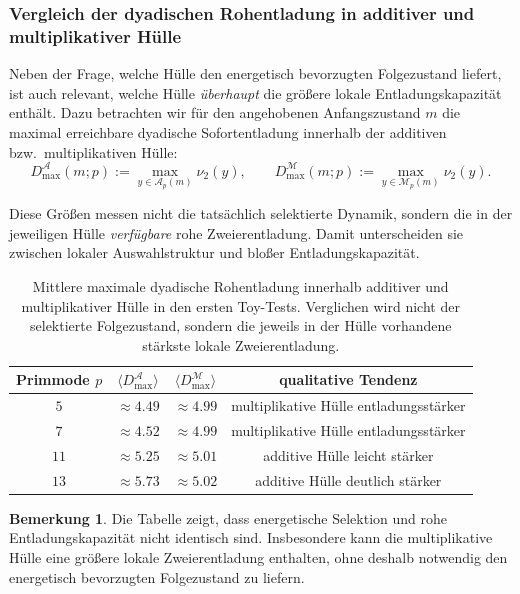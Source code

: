 \documentclass[11pt,a4paper]{article}
\theoremstyle{definition}
\newtheorem{bemerkung}{Bemerkung}
\begin{document}
\subsubsection{Vergleich der dyadischen Rohentladung in additiver und multiplikativer Hülle}

Neben der Frage, welche Hülle den energetisch bevorzugten Folgezustand liefert, ist auch relevant, welche Hülle \emph{überhaupt} die größere lokale Entladungskapazität enthält. Dazu betrachten wir für den angehobenen Anfangszustand \(m\) die maximal erreichbare dyadische Sofortentladung innerhalb der additiven bzw.\ multiplikativen Hülle:
\[
D_{\max}^{\mathcal A}(m;p):=\max_{y\in\mathcal A_p(m)} \nu_2(y),
\qquad
D_{\max}^{\mathcal M}(m;p):=\max_{y\in\mathcal M_p(m)} \nu_2(y).
\]

Diese Größen messen nicht die tatsächlich selektierte Dynamik, sondern die in der jeweiligen Hülle \emph{verfügbare} rohe Zweierentladung. Damit unterscheiden sie zwischen lokaler Auswahlstruktur und bloßer Entladungskapazität.

\begin{table}[h]
	\centering
	\begin{tabular}{cccc}
		\hline
		Primmode \(p\) & \(\langle D_{\max}^{\mathcal A}\rangle\) & \(\langle D_{\max}^{\mathcal M}\rangle\) & qualitative Tendenz \\
		\hline
		\(5\)  & \(\approx 4.49\) & \(\approx 4.99\) & multiplikative Hülle entladungsstärker \\
		\(7\)  & \(\approx 4.52\) & \(\approx 4.99\) & multiplikative Hülle entladungsstärker \\
		\(11\) & \(\approx 5.25\) & \(\approx 5.01\) & additive Hülle leicht stärker \\
		\(13\) & \(\approx 5.73\) & \(\approx 5.02\) & additive Hülle deutlich stärker \\
		\hline
	\end{tabular}
	\caption{Mittlere maximale dyadische Rohentladung innerhalb additiver und multiplikativer Hülle in den ersten Toy-Tests. Verglichen wird nicht der selektierte Folgezustand, sondern die jeweils in der Hülle vorhandene stärkste lokale Zweierentladung.}
	\label{tab:huellen-rohentladung}
\end{table}

\begin{bemerkung}
	Die Tabelle zeigt, dass energetische Selektion und rohe Entladungskapazität nicht identisch sind. Insbesondere kann die multiplikative Hülle eine größere lokale Zweierentladung enthalten, ohne deshalb notwendig den energetisch bevorzugten Folgezustand zu liefern.
\end{bemerkung}
\end{document}
